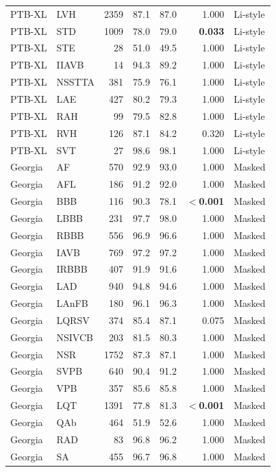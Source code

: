 \begin{longtable}{@{}llrrrrl@{}}
PTB-XL & LVH & 2359 & 87.1 & 87.0 & 1.000 & Li-style \\
PTB-XL & STD & 1009 & 78.0 & 79.0 & \textbf{0.033} & Li-style \\
PTB-XL & STE & 28 & 51.0 & 49.5 & 1.000 & Li-style \\
PTB-XL & IIAVB & 14 & 94.3 & 89.2 & 1.000 & Li-style \\
PTB-XL & NSSTTA & 381 & 75.9 & 76.1 & 1.000 & Li-style \\
PTB-XL & LAE & 427 & 80.2 & 79.3 & 1.000 & Li-style \\
PTB-XL & RAH & 99 & 79.5 & 82.8 & 1.000 & Li-style \\
PTB-XL & RVH & 126 & 87.1 & 84.2 & 0.320 & Li-style \\
PTB-XL & SVT & 27 & 98.6 & 98.1 & 1.000 & Li-style \\
\midrule
Georgia & AF & 570 & 92.9 & 93.0 & 1.000 & Masked \\
Georgia & AFL & 186 & 91.2 & 92.0 & 1.000 & Masked \\
Georgia & BBB & 116 & 90.3 & 78.1 & \textbf{$<$0.001} & Masked \\
Georgia & LBBB & 231 & 97.7 & 98.0 & 1.000 & Masked \\
Georgia & RBBB & 556 & 96.9 & 96.6 & 1.000 & Masked \\
Georgia & IAVB & 769 & 97.2 & 97.2 & 1.000 & Masked \\
Georgia & IRBBB & 407 & 91.9 & 91.6 & 1.000 & Masked \\
Georgia & LAD & 940 & 94.8 & 94.6 & 1.000 & Masked \\
Georgia & LAnFB & 180 & 96.1 & 96.3 & 1.000 & Masked \\
Georgia & LQRSV & 374 & 85.4 & 87.1 & 0.075 & Masked \\
Georgia & NSIVCB & 203 & 81.5 & 80.3 & 1.000 & Masked \\
Georgia & NSR & 1752 & 87.3 & 87.1 & 1.000 & Masked \\
Georgia & SVPB & 640 & 90.4 & 91.2 & 1.000 & Masked \\
Georgia & VPB & 357 & 85.6 & 85.8 & 1.000 & Masked \\
Georgia & LQT & 1391 & 77.8 & 81.3 & \textbf{$<$0.001} & Masked \\
Georgia & QAb & 464 & 51.9 & 52.6 & 1.000 & Masked \\
Georgia & RAD & 83 & 96.8 & 96.2 & 1.000 & Masked \\
Georgia & SA & 455 & 96.7 & 96.8 & 1.000 & Masked \\

\end{longtable}
